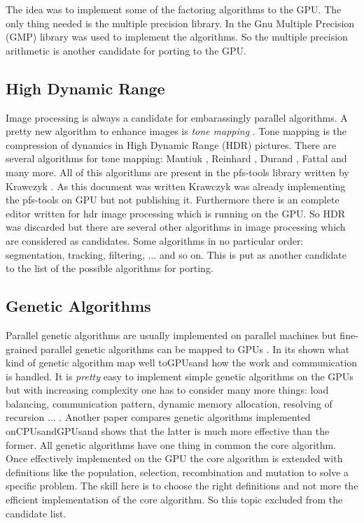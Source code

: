 The idea was to implement some of the factoring algorithms to the GPU. The only
thing needed is the multiple precision library. In \citep{citeulike:3783254} the
Gnu Multiple Precision (GMP) library was used to implement the algorithms. So
the multiple precision arithmetic is another candidate for porting to the GPU.

\subsection{High Dynamic Range} %
\label{par:high_dynamic_range}
Image processing is always a candidate for embarassingly parallel algorithms. A
pretty new algorithm to enhance images is \emph{tone mapping}
\citep{citeulike:3783303}. Tone mapping is the compression of dynamics in High
Dynamic Range (HDR) pictures. There are several algorithms for tone mapping:
Mantiuk \citep{citeulike:3783315}, Reinhard \citep{citeulike:3783311}, Durand
\citep{citeulike:789299}, Fattal \citep{citeulike:3783313} and many more. All of
this algorithms are present in the pfs-tools library written by Krawczyk
\citep{citeulike:3783303}. As this document was written Krawczyk was already
implementing the pfs-tools on \gls{GPU} but not publishing it. Furthermore there is an
complete editor written for hdr image processing which is running on the GPU. So
HDR was discarded but there are several other algorithms in image processing
which are considered as candidates. Some algorithms in no particular order:
segmentation, tracking, filtering, ... and so on. This is put as another
candidate to the list of the possible algorithms for porting. 

\subsection{Genetic Algorithms} %
\label{par:genetic_algorithms}
Parallel genetic algorithms are usually implemented on parallel machines but
fine-grained parallel genetic algorithms can be mapped to GPUs
\citep{citeulike:3801879}. In \citep{citeulike:3801866} its shown what kind of
genetic algorithm map well to\glspl{GPU}and how the work and communication is
handled. It is \emph{pretty} easy to implement simple genetic algorithms on the
GPUs but with increasing complexity one has to consider many more things: load
balancing, communication pattern, dynamic memory allocation, resolving of
recursion ... . Another paper \citep{citeulike:3801883} compares genetic
algorithms implemented on\glspl{CPU}and\glspl{GPU}and shows that the latter is much more
effective than the former. All genetic algorithms have one thing in common the
core algorithm. Once effectively implemented on the \gls{GPU} the core algorithm is
extended with definitions like the population, selection, recombination and
mutation to solve a specific problem. The skill here is to choose the right
definitions and not more the efficient implementation of the core algorithm. So
this topic excluded from the candidate list.

